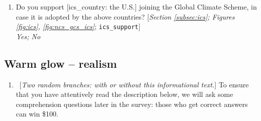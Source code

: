 \documentclass[12pt,english]{article}
\begin{document}
\begin{bibunit}
\begin{enumerate}[resume]
\item  \label{q:ics_support} Do you support [ics\_country: the U.S.] joining the Global Climate Scheme, in case it is adopted by the above countries? [\textit{Section \ref{subsec:ics}; Figures \ref{fig:ics}, \ref{fig:ncs_gcs_ics}}; 
\verb|ics_support|]
  \\ \textit{Yes; No}

\end{enumerate} 

 \subsection*{Warm glow -- realism} 
 \begin{enumerate}[resume] 
\item ~[\textit{Two random branches: with or without this informational text.}] \label{q:info_solidarity} To ensure that you have attentively read the description below, we will ask some comprehension questions later in the survey: those who get correct answers can win \$100.


\end{enumerate}
\end{bibunit}
\end{document}

